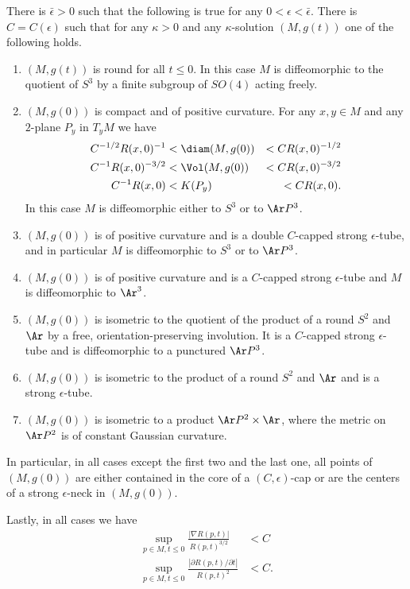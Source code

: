 \begin{theorem}\label{thm:kappa-solution-structure-summary}
\label{kappasummary}
There is  $\bar \epsilon>0$ such that the following is true for any
$0<\epsilon<\bar \epsilon$.  There is $C=C(\epsilon)$ such that for
any $\kappa>0$ and any $\kappa$-solution $(M,g(t))$ one of the
following holds.
\begin{enumerate}
\item[(1)] $(M,g(t))$ is round for all $t\le 0$. In this case $M$ is
diffeomorphic to the quotient of $S^3$ by a finite subgroup of
$SO(4)$ acting freely.
\item[(2)] $(M,g(0))$ is compact and of positive curvature. For any $x,y\in M$
and any $2$-plane $P_y$ in $T_yM$
 we have \begin{eqnarray*}
 C^{-1/2}R(x,0)^{-1} &  <\diam(M,g(0))
 &  <CR(x,0)^{-1/2} \\
 C^{-1}R(x,0)^{-3/2} & < \Vol(M,g(0)) & < CR(x,0)^{-3/2} \\
C^{-1}R(x,0) & < K(P_y) & < CR(x,0).
\end{eqnarray*}
  In this case $M$ is diffeomorphic either to
 $S^3$ or to $\Ar P^3$.
 \item[(3)] $(M,g(0))$ is of positive curvature and is a double  $C$-capped strong
 $\epsilon$-tube, and in
 particular $M$ is diffeomorphic to $S^3$ or to $\Ar P^3$.
 \item[(4)] $(M,g(0))$ is of positive curvature and is a
 $C$-capped strong $\epsilon$-tube and $M$ is diffeomorphic to $\Ar ^3$.
 \item[(5)] $(M,g(0))$ is isometric to the quotient of the product of
 a round $S^2$ and $\Ar$ by a
 free, orientation-preserving involution. It is a  $C$-capped
 strong $\epsilon$-tube and is diffeomorphic to a punctured $\Ar P^3$.
 \item[(6)] $(M,g(0))$ is isometric to the product of a round $S^2$ and $ \Ar$
  and is a strong $\epsilon$-tube.
 \item[(7)] $(M,g(0))$ is isometric to a product $\Ar P^2\times \Ar$, where the metric on $\Ar P^2$
 is of constant Gaussian curvature.
\end{enumerate}

In particular, in all cases except the first two and the last one,
all points of $(M,g(0))$ are either contained in the core of a
$(C,\epsilon)$-cap or are the centers of a strong $\epsilon$-neck in
$(M,g(0))$.

Lastly, in all cases we have \begin{eqnarray}\sup_{p\in M, t\le
0}\frac{|\nabla
R(p,t)|}{R(p,t)^{3/2}} & <C \label{nablaR} \\
\sup_{p\in M,t\le 0}\frac{\left|\partial R(p,t)/\partial
t\right|}{R(p,t)^2} & <C.\label{dRdt}
\end{eqnarray}
\end{theorem}



